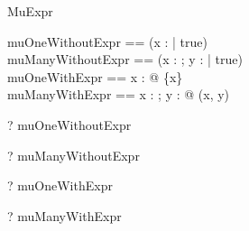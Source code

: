 \begin{zsection}
  \SECTION MuExpr
\end{zsection}

\begin{zed}
  muOneWithoutExpr == (\mu x : \nat | true)\\
  muManyWithoutExpr == (\mu x : \nat; y : \power \nat | true)\\
  muOneWithExpr == \mu x : \nat @ \{x\}\\
  muManyWithExpr == \mu x : \nat; y : \power \nat @ (x, y)
\end{zed}

\begin{zed} \vdash? muOneWithoutExpr \in \nat \end{zed}
\begin{zed} \vdash? muManyWithoutExpr \in \nat \cross \power \nat \end{zed}
\begin{zed} \vdash? muOneWithExpr \in \power \nat \end{zed}
\begin{zed} \vdash? muManyWithExpr \in \nat \cross \power \nat \end{zed}
